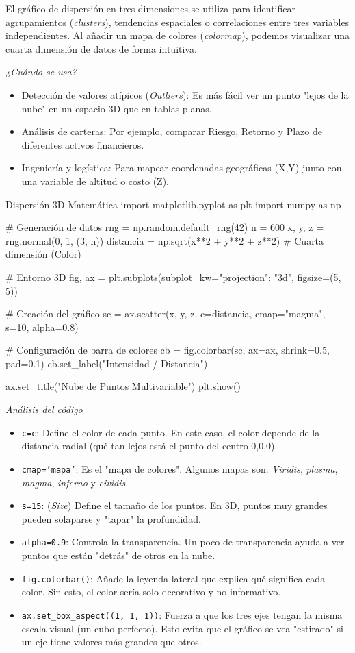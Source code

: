 El gráfico de dispersión en tres dimensiones se utiliza para identificar agrupamientos (\textit{clusters}), tendencias espaciales o correlaciones entre tres variables independientes. Al añadir un mapa de colores (\textit{colormap}), podemos visualizar una cuarta dimensión de datos de forma intuitiva.

\emph{¿Cuándo se usa?}
\begin{itemize}
\item Detección de valores atípicos (\textit{Outliers}): Es más fácil ver un punto "lejos de la nube" en un espacio 3D que en tablas planas.
\item Análisis de carteras: Por ejemplo, comparar Riesgo, Retorno y Plazo de diferentes activos financieros.
\item Ingeniería y logística: Para mapear coordenadas geográficas (X,Y) junto con una variable de altitud o costo (Z).
\end{itemize}

\begin{pycode}{Dispersión 3D Matemática}
import matplotlib.pyplot as plt
import numpy as np

# Generación de datos
rng = np.random.default_rng(42)
n = 600
x, y, z = rng.normal(0, 1, (3, n))
distancia = np.sqrt(x**2 + y**2 + z**2) # Cuarta dimensión (Color)

# Entorno 3D
fig, ax = plt.subplots(subplot_kw={"projection": "3d"}, figsize=(5, 5))

# Creación del gráfico
sc = ax.scatter(x, y, z, c=distancia, cmap="magma", s=10, alpha=0.8)

# Configuración de barra de colores
cb = fig.colorbar(sc, ax=ax, shrink=0.5, pad=0.1) 
cb.set_label("Intensidad / Distancia")

ax.set_title("Nube de Puntos Multivariable")
plt.show()
\end{pycode}

\emph{Análisis del código}
\begin{itemize}
\item \texttt{c=c}: Define el color de cada punto. En este caso, el color depende de la distancia radial (qué tan lejos está el punto del centro 0,0,0).
\item \texttt{cmap='mapa'}: Es el "mapa de colores". Algunos mapas son: \textit{Viridis}, \textit{plasma}, \textit{magma}, \textit{inferno} y \textit{cividis}.
\item \texttt{s=15}: (\textit{Size}) Define el tamaño de los puntos. En 3D, puntos muy grandes pueden solaparse y "tapar" la profundidad.
\item \texttt{alpha=0.9}: Controla la transparencia. Un poco de transparencia ayuda a ver puntos que están "detrás" de otros en la nube.
\item \texttt{fig.colorbar()}: Añade la leyenda lateral que explica qué significa cada color. Sin esto, el color sería solo decorativo y no informativo.
\item \texttt{ax.set\_box\_aspect((1, 1, 1))}: Fuerza a que los tres ejes tengan la misma escala visual (un cubo perfecto). Esto evita que el gráfico se vea "estirado" si un eje tiene valores más grandes que otros.
\end{itemize}

